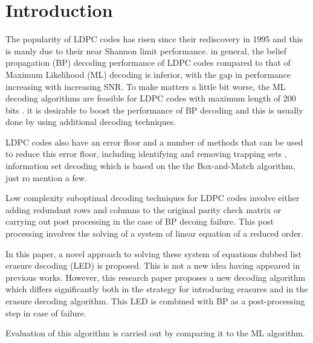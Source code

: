 \documentclass[11pt, oneside, dvipdfmx]{book}
\begin{document}
\section {Introduction}


The popularity of LDPC codes has risen since their rediscovery in 1995 and this is manly due to their near Shannon limit performance. in general, the belief propagation (BP) decoding performance of LDPC codes compared to that of Maximum Likelihood (ML) decoding is inferior, with the gap in performance increasing with increasing SNR. To make matters a little bit worse, the ML decoding algorithms are feasible for LDPC codes with maximum length of 200 bits . it is desirable to boost the performance of BP decoding and this is usually done by using additional decoding techniques.

LDPC codes also have an error floor and a number of methods that can be used to reduce this error floor, including identifying and removing trapping sets , information set decoding which is based on the the Box-and-Match algorithm, just ro mention a few.


Low complexity suboptimal decoding techniques for LDPC codes involve  either adding redundant rows and columns to the original parity check matrix or carrying out post processing in the case of BP decoing failure. This post processing involves the solving of a system of linear equation of a reduced order.

In this paper, a novel approach to solving these system of equations dubbed  list erasure decoding (LED) is proposed. This is not a new idea having appeared in previous works. However, this research paper proposes a new decoding algorithm which differs significantly both in the strategy for introducing erasures and in the erasure decoding algorithm. This LED is combined with BP as a post-processing step in case of failure.

Evaluation of this algorithm is carried out by comparing it to the ML algorithm.
 
\end{document}
